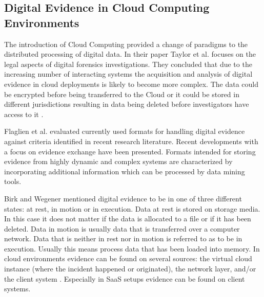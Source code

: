 \documentclass[runningheads,a4paper]{llncs}
\begin{document}
\subsection{Digital Evidence in Cloud Computing Environments}

The introduction of Cloud Computing provided a change of paradigms to the distributed processing of digital data. In their paper Taylor et al. \cite{Taylor2010} focuses on the legal aspects of digital forensics investigations. They concluded that due to the increasing number of interacting systems the acquisition and analysis of digital evidence in cloud deployments is likely to become more complex. The data could be encrypted before being transferred to the Cloud or it could be stored in different jurisdictions resulting in data being deleted before investigators have access to it \cite{Mason2011}. 

Flaglien et al. \cite{Flaglien2011} evaluated currently used formats for handling digital evidence against criteria identified in recent research literature. Recent developments with a focus on evidence exchange have been presented. Formats intended for storing evidence from highly dynamic and complex systems are characterized by incorporating additional information which can be processed by data mining tools.  

Birk \cite{Birk2011} and Wegener \cite{Birk2011a} mentioned digital evidence to be in one of three different states: at rest, in motion or in execution. Data at rest is stored on storage media. In this case it does not matter if the data is allocated to a file or if it has been deleted. Data in motion is usually data that is transferred over a computer network. Data that is neither in rest nor in motion is referred to as to be in execution. Usually this means process data that has been loaded into memory. In cloud environments evidence can be found on several sources: the virtual cloud instance (where the incident happened or originated), the network layer, and/or the client system \cite{Zimmerman2011,Birk2011}. Especially in SaaS setups evidence can be found on client systems. 
\end{document}

